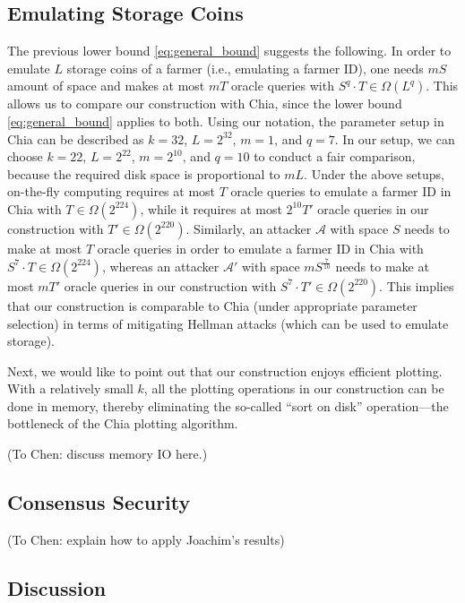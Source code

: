 \documentclass[12pt, onecolumn]{IEEEtran}
\begin{document}
\subsection{Emulating Storage Coins}

The previous lower bound \eqref{eq:general_bound} suggests the following. In order to emulate $L$ storage coins of a farmer (i.e., emulating a farmer ID), one needs $mS$
amount of space and makes at most $mT$ oracle queries with $S^q \cdot T \in \Omega\left(L^q \right)$. 
This allows us to compare our construction with Chia, since the lower bound \eqref{eq:general_bound} applies to both.
Using our notation, the parameter setup in Chia can be described as $k = 32$, $L = 2^{32}$, $m = 1$, and $q = 7$. 
In our setup, we can choose $k = 22$, $L = 2^{22}$, $m = 2^{10}$, and $q = 10$ to conduct a fair comparison, 
because the required disk space is proportional to $m L$.
Under the above setups, on-the-fly computing requires at most $T$ oracle queries to emulate a farmer ID in Chia with $T \in \Omega\left( 2^{224} \right)$,
while it requires at most $2^{10} T'$ oracle queries in our construction with $T' \in \Omega\left( 2^{220} \right)$. 
Similarly, an attacker $\mathcal{A}$ with space $S$ needs to make at most $T$
oracle queries in order to emulate  a farmer ID in Chia with $S^7 \cdot T \in \Omega\left( 2^{224}  \right)$, whereas an attacker $\mathcal{A}'$ with space $m {S}^{\frac{7}{10}}$
needs to make at most $m T'$ oracle queries in our construction with $S^7 \cdot T' \in \Omega\left( 2^{220}  \right)$.
This implies that our construction is comparable to Chia (under appropriate parameter selection) in terms of mitigating Hellman attacks (which can be used to emulate storage).

Next, we would like to point out that  our construction enjoys efficient plotting. With a relatively small $k$, all the plotting operations in our construction can be done in memory, thereby eliminating the so-called ``sort on disk'' operation---the bottleneck of the Chia plotting algorithm. 

(To Chen: discuss memory IO here.)

\subsection{Consensus Security}

(To Chen: explain how to apply Joachim's results)

\subsection{Discussion}
\end{document}
